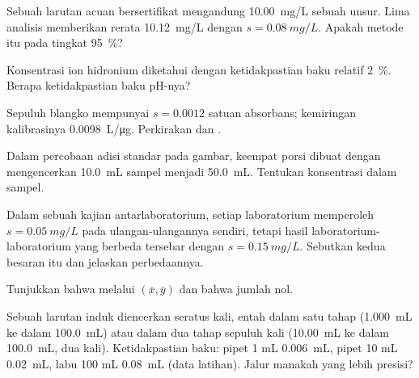\begin{exercise}[$\star\star$]\label{exo:b2:measurement-statistics:5}
Sebuah larutan acuan bersertifikat mengandung \qty{10.00}{mg/L} sebuah
unsur. Lima analisis memberikan rerata
\qty{10.12}{mg/L} dengan $s = \qty{0.08}{mg/L}$. Apakah metode itu  pada tingkat 95~\%?
\end{exercise}

\begin{exercise}[$\star\star$]\label{exo:b2:measurement-statistics:6}
Konsentrasi ion hidronium diketahui dengan ketidakpastian baku relatif 2~\%.
Berapa ketidakpastian baku pH-nya?
\end{exercise}

\begin{exercise}[$\star\star$]\label{exo:b2:measurement-statistics:7}
Sepuluh blangko mempunyai $s = 0.0012$ satuan absorbans; kemiringan
kalibrasinya \qty{0.0098}{L/\micro g}. Perkirakan  dan .
\end{exercise}

\begin{exercise}[$\star\star$]\label{exo:b2:measurement-statistics:8}
Dalam percobaan adisi standar pada gambar, keempat porsi dibuat dengan
mengencerkan
\qty{10.0}{mL} sampel menjadi \qty{50.0}{mL}. Tentukan konsentrasi dalam sampel.
\end{exercise}

\begin{exercise}[$\star\star$]\label{exo:b2:measurement-statistics:9}
Dalam sebuah kajian antarlaboratorium, setiap laboratorium memperoleh
$s = \qty{0.05}{mg/L}$ pada ulangan-ulangannya sendiri, tetapi hasil
laboratorium-laboratorium yang berbeda tersebar dengan $s = \qty{0.15}{mg/L}$.
Sebutkan kedua besaran itu dan jelaskan perbedaannya.
\end{exercise}

\begin{exercise}[$\star\star\star$]\label{exo:b2:measurement-statistics:10}
Tunjukkan bahwa  melalui $(\bar x, \bar y)$ dan bahwa jumlah  nol.
\end{exercise}

\begin{exercise}[$\star\star\star$]\label{exo:b2:measurement-statistics:11}
Sebuah larutan induk diencerkan seratus kali, entah dalam satu tahap
(\qty{1.000}{mL} ke dalam \qty{100.0}{mL}) atau dalam dua tahap sepuluh kali
(\qty{10.00}{mL} ke dalam \qty{100.0}{mL}, dua kali). Ketidakpastian baku:
pipet 1 mL \qty{0.006}{mL}, pipet 10 mL \qty{0.02}{mL}, labu 100 mL
\qty{0.08}{mL} (data latihan). Jalur manakah yang lebih presisi?
\end{exercise}

